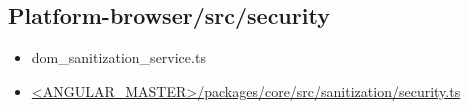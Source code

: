 \subsection{Platform-browser/src/security}


\begin{itemize}
  \item dom\_sanitization\_service.ts
\end{itemize}





\begin{itemize}
  \item \href{https://github.com/angular/angular/blob/master/packages/core/src/sanitization/security.ts}
        {<ANGULAR\_MASTER>/packages/core/src/sanitization/security.ts}
\end{itemize}













